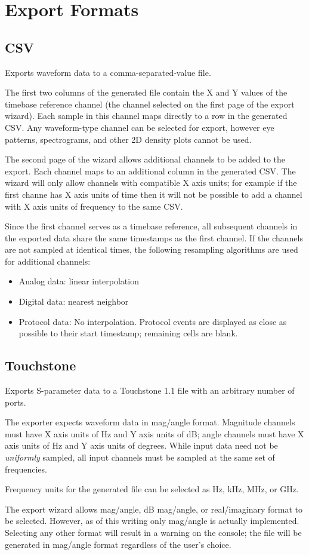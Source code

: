 \chapter{Export Formats}
\label{chap:exports}

\section{CSV}

Exports waveform data to a comma-separated-value file.

The first two columns of the generated file contain the X and Y values of the timebase reference channel (the channel
selected on the first page of the export wizard). Each sample in this channel maps directly to a row in the generated
CSV. Any waveform-type channel can be selected for export, however eye patterns, spectrograms, and other 2D density
plots cannot be used.

The second page of the wizard allows additional channels to be added to the export. Each channel maps to an additional
column in the generated CSV. The wizard will only allow channels with compatible X axis units; for example if the first
channe has X axis units of time then it will not be possible to add a channel with X axis units of frequency to the
same CSV.

Since the first channel serves as a timebase reference, all subsequent channels in the exported data share the same
timestamps as the first channel. If the channels are not sampled at identical times, the following resampling
algorithms are used for additional channels:

\begin{itemize}
\item Analog data: linear interpolation
\item Digital data: nearest neighbor
\item Protocol data: No interpolation. Protocol events are displayed as close as possible to their start timestamp;
remaining cells are blank.
\end{itemize}

\section{Touchstone}

Exports S-parameter data to a Touchstone 1.1 file with an arbitrary number of ports.

The exporter expects waveform data in mag/angle format. Magnitude channels must have X axis units of Hz and Y axis
units of dB; angle channels must have X axis units of Hz and Y axis units of degrees. While input data need not be
\emph{uniformly} sampled, all input channels must be sampled at the same set of frequencies.

Frequency units for the generated file can be selected as Hz, kHz, MHz, or GHz.

The export wizard allows mag/angle, dB mag/angle, or real/imaginary format to be selected. However, as of this writing
only mag/angle is actually implemented. Selecting any other format will result in a warning on the console; the file
will be generated in mag/angle format regardless of the user's choice.
